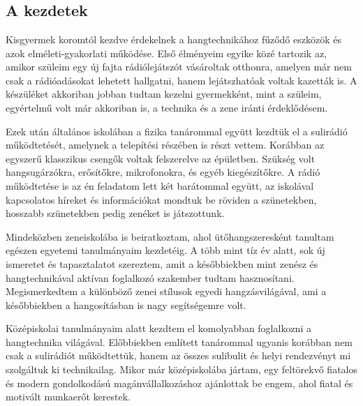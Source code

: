 \chapter{\bevezetes}

\section{A kezdetek}

Kisgyermek koromtól kezdve érdekelnek a hangtechnikához fűződő eszközök és azok elméleti-gyakorlati működése. Első élményeim egyike közé tartozik az, amikor
szüleim egy új fajta rádiólejátszót vásároltak otthonra, amelyen már nem csak a rádióadásokat lehetett hallgatni, hanem lejátszhatóak voltak kazetták is.
A készüléket akkoriban jobban tudtam kezelni gyermekként, mint a szüleim, egyértelmű volt már akkoriban is, a technika és a zene iránti érdeklődésem. 

Ezek után általános iskolában a fizika tanárommal együtt kezdtük el a sulirádió működtetését, amelynek a telepítési részében is részt vettem.
Korábban az egyszerű klasszikus csengők voltak felszerelve az épületben. Szükség volt hangsugárzókra, erősítőkre, mikrofonokra, és egyéb kiegészítőkre. A rádió működtetése
is az én feladatom lett két barátommal együtt, az iskolával kapcsolatos híreket és információkat mondtuk be röviden a szünetekben, hosszabb szünetekben pedig zenéket is játszottunk.

Mindeközben zeneiskolába is beiratkoztam, ahol ütőhangszeresként tanultam egészen egyetemi tanulmányaim kezdetéig. A több mint tíz év alatt, sok új ismeretet és tapasztalatot szereztem,
amit a későbbiekben mint zenész és hangtechnikával aktívan foglalkozó szakember tudtam hasznosítani. Megismerkedtem a különböző zenei stílusok egyedi hangzásvilágával, ami a későbbiekben a hangosításban is nagy segítségemre volt.

Középiskolai tanulmányaim alatt kezdtem el komolyabban foglalkozni a hangtechnika világával.
Előbbiekben említett tanárommal ugyanis korábban nem csak a sulirádiót működtettük, hanem az összes sulibulit és helyi rendezvényt mi szolgáltuk ki technikailag.
Mikor már középiskolába jártam, egy feltörekvő fiatalos és modern gondolkodású magánvállalkozáshoz ajánlottak be engem, ahol fiatal és motivált munkaerőt kerestek.

